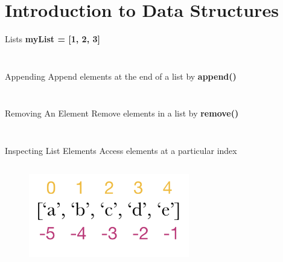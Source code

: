     \section{Introduction to Data Structures}
        \begin{frame}{Lists}
                \Huge {\textbf{myList = [1, 2, 3]}}
                \pause  
                \inputminted[frame=single,framesep=2pt]{python3}{code-examples/intro_lists.py}
                \pause  
                \inputminted[frame=single,framesep=2pt]{python3}{code-examples/mixed_list.py}
        \end{frame}
        \begin{frame}{Appending}
            Append elements at the end of a list by \textbf{append()}
            \bigskip
            \inputminted[frame=single,framesep=2pt]{python3}{code-examples/append_list.py}
            \pause  
            \inputminted[frame=single,framesep=2pt]{python3}{code-examples/append_list2.py}
        \end{frame}
        \begin{frame}{Removing An Element}
            Remove elements in a list by \textbf{remove()}
            \bigskip
            \inputminted[frame=single,framesep=2pt]{python3}{code-examples/remove.py}
            \pause  
            \inputminted[frame=single,framesep=2pt]{python3}{code-examples/remove2.py}
        \end{frame}
        \begin{frame}{Inspecting List Elements}
            Access elements at a particular index
            \begin{columns}
               \begin{column}{0.5\textwidth}
                \vspace{-5mm}
                \begin{figure}[H]
                    \bigskip
                    \includegraphics[width=70mm]{code-examples/index.png}
                    \end{figure}    
               \end{column}
              \pause 
               \begin{column}{0.5\textwidth}
                \inputminted[frame=single,framesep=2pt]{python3}{code-examples/index.py}
               \end{column} 
            \end{columns}
        \end{frame}
